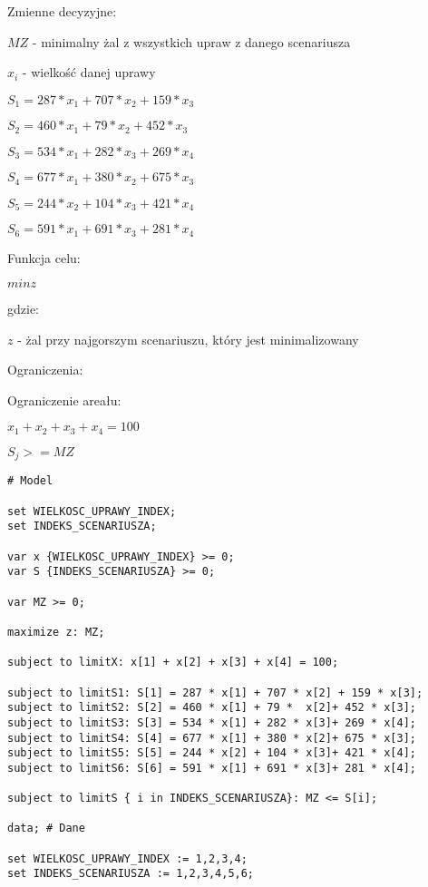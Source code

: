 \documentclass{article}
\begin{document}
\noindent
Zmienne decyzyjne:

$MZ$ - minimalny żal z wszystkich upraw z danego scenariusza

$x_i$ - wielkość danej uprawy

$S_1 = 287 * x_1 + 707 * x_2 + 159 * x_3$

$S_2 = 460 * x_1 + 79 * x_2 + 452 * x_3$

$S_3 = 534 * x_1 + 282 * x_3 + 269 * x_4$

$S_4 = 677 * x_1 + 380 * x_2 + 675 * x_3$

$S_5 = 244 * x_2 + 104 * x_3 + 421 * x_4$

$S_6 = 591 * x_1 + 691 * x_3 + 281 * x_4$


\noindent
Funkcja celu:

$min z$

gdzie:

$z$ - żal przy najgorszym scenariuszu, który jest minimalizowany

\noindent
Ograniczenia:

Ograniczenie areału:

$x_1 + x_2 + x_3 + x_4 = 100$

$S_j >= MZ$

\lstset{language=AMPL}
\begin{lstlisting}[caption={Model napisany w języku AMPL},label=DescriptiveLabel]
# Model

set WIELKOSC_UPRAWY_INDEX;
set INDEKS_SCENARIUSZA;

var x {WIELKOSC_UPRAWY_INDEX} >= 0;
var S {INDEKS_SCENARIUSZA} >= 0;

var MZ >= 0;

maximize z: MZ;

subject to limitX: x[1] + x[2] + x[3] + x[4] = 100;

subject to limitS1: S[1] = 287 * x[1] + 707 * x[2] + 159 * x[3];
subject to limitS2: S[2] = 460 * x[1] + 79 *  x[2]+ 452 * x[3];
subject to limitS3: S[3] = 534 * x[1] + 282 * x[3]+ 269 * x[4];
subject to limitS4: S[4] = 677 * x[1] + 380 * x[2]+ 675 * x[3];
subject to limitS5: S[5] = 244 * x[2] + 104 * x[3]+ 421 * x[4];
subject to limitS6: S[6] = 591 * x[1] + 691 * x[3]+ 281 * x[4];

subject to limitS { i in INDEKS_SCENARIUSZA}: MZ <= S[i];

data; # Dane

set WIELKOSC_UPRAWY_INDEX := 1,2,3,4;
set INDEKS_SCENARIUSZA := 1,2,3,4,5,6;
\end{lstlisting}
\end{document}
